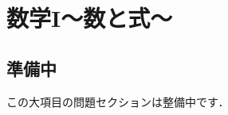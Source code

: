 \documentclass[../../../ms_q.tex]{subfiles}
\begin{document}
\section{数学I～数と式～}

\subsection*{準備中}
この大項目の問題セクションは整備中です．
\end{document}
